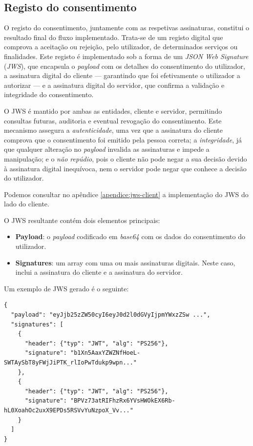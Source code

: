 \newpage

\subsection{Registo do consentimento}

O registo do consentimento, juntamente com as respetivas assinaturas, constitui o resultado final do fluxo implementado. Trata-se de um registo digital que comprova a aceitação ou rejeição, pelo utilizador, de determinados serviços ou finalidades. Este registo é implementado sob a forma de um \textit{JSON Web Signature} (\textit{JWS}), que encapsula o \textit{payload} com os detalhes do consentimento do utilizador, a assinatura digital do cliente — garantindo que foi efetivamente o utilizador a autorizar — e a assinatura digital do servidor, que confirma a validação e integridade do consentimento.

O JWS é mantido por ambas as entidades, cliente e servidor, permitindo consultas futuras, auditoria e eventual revogação do consentimento. Este mecanismo assegura a \textit{autenticidade}, uma vez que a assinatura do cliente comprova que o consentimento foi emitido pela pessoa correta; a \textit{integridade}, já que qualquer alteração no \textit{payload} invalida as assinaturas e impede a manipulação; e o \textit{não repúdio}, pois o cliente não pode negar a sua decisão devido à assinatura digital inequívoca, nem o servidor pode negar que conhece a decisão do utilizador.

Podemos consultar no apêndice \ref{apendice:jws-client} a implementação do JWS do lado do cliente.

O JWS resultante contém dois elementos principais:

\begin{itemize}
    \item \textbf{Payload}: o \textit{payload} codificado em \textit{base64} com os dados do consentimento do utilizador.
    \item \textbf{Signatures}: um array com uma ou mais assinaturas digitais. Neste caso, inclui a assinatura do cliente e a assinatura do servidor.
\end{itemize}

Um exemplo de JWS gerado é o seguinte:

\begin{lstlisting}
{
  "payload": "eyJjb25zZW50cyI6eyJ0d2l0dGVyIjpmYWxzZSw ...",
  "signatures": [
    {
      "header": {"typ": "JWT", "alg": "PS256"},
      "signature": "b1Xn5AaxYZWZNfHoeL-SWTAySbT8yFWjJiPTK_rlIoPwTdukp9wpn..."
    },
    {
      "header": {"typ": "JWT", "alg": "PS256"},
      "signature": "BPVz73atRIFhzRx6YVsHWOkEX6Rb-hL0XoahOc2uxX9EPDs5RSVvYuNzpoX_Vv..."
    }
  ]
}
\end{lstlisting}

